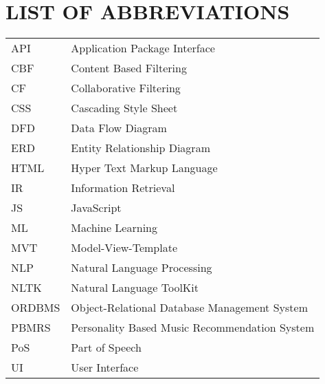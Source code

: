 
\section*{LIST OF ABBREVIATIONS}

\begin{tabular}{l l}
API & Application Package Interface\\
CBF & Content Based Filtering\\
CF & Collaborative Filtering\\
CSS & Cascading Style Sheet\\
DFD & Data Flow Diagram\\
ERD & Entity Relationship Diagram\\
HTML & Hyper Text Markup Language\\
IR & Information Retrieval\\
JS & JavaScript\\
ML & Machine Learning\\
MVT & Model-View-Template\\
NLP & Natural Language Processing\\
NLTK & Natural Language ToolKit\\
ORDBMS & Object-Relational Database Management System\\
PBMRS & Personality Based Music Recommendation System\\
PoS & Part of Speech\\
UI & User Interface\\
\end{tabular}
